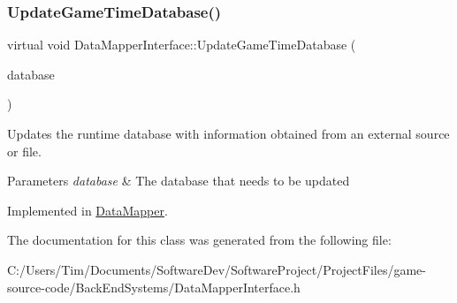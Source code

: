 \subsubsection{\texorpdfstring{Update\+Game\+Time\+Database()}{UpdateGameTimeDatabase()}}
{\footnotesize\ttfamily virtual void Data\+Mapper\+Interface\+::\+Update\+Game\+Time\+Database (\begin{DoxyParamCaption}\item[{std\+::shared\+\_\+ptr$<$ \hyperlink{class_database_interface}{Database\+Interface} $>$}]{database }\end{DoxyParamCaption})\hspace{0.3cm}{\ttfamily [pure virtual]}}



Updates the runtime database with information obtained from an external source or file. 


\begin{DoxyParams}{Parameters}
{\em database} & The database that needs to be updated \\
\hline
\end{DoxyParams}


Implemented in \hyperlink{class_data_mapper_ade3e27146120b3cb74d556e8b9e48526}{Data\+Mapper}.



The documentation for this class was generated from the following file\+:\begin{DoxyCompactItemize}
\item 
C\+:/\+Users/\+Tim/\+Documents/\+Software\+Dev/\+Software\+Project/\+Project\+Files/game-\/source-\/code/\+Back\+End\+Systems/Data\+Mapper\+Interface.\+h\end{DoxyCompactItemize}
